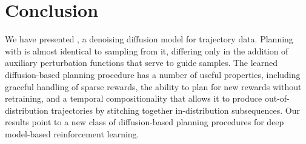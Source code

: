 \vspace{-.15cm}
\section{Conclusion}
\label{sec:discussion}
We have presented \method, a denoising diffusion model for trajectory data.
Planning with \method is almost identical to sampling from it, differing only in the addition of auxiliary perturbation functions that serve to guide samples.
The learned diffusion-based planning procedure has a number of useful properties, including graceful handling of sparse rewards, the ability to plan for new rewards without retraining, and a temporal compositionality that allows it to produce out-of-distribution trajectories by stitching together in-distribution subsequences.
Our results point to a new class of diffusion-based planning procedures for deep model-based reinforcement learning.
